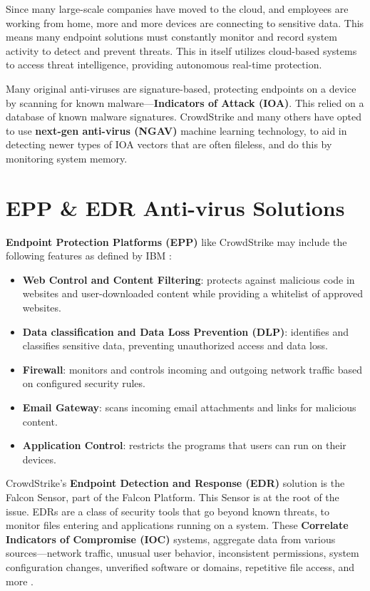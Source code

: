 Since many large-scale companies have moved to the cloud, and employees are working from home, more and more devices are connecting to sensitive data. This means many endpoint solutions must constantly monitor and record system activity to detect and prevent threats. This in itself utilizes cloud-based systems to access threat intelligence, providing autonomous real-time protection. \cite{cisco_endpoint_security}

Many original anti-viruses are signature-based, protecting endpoints on a device by scanning for known malware---\textbf{Indicators of Attack (IOA)}. 
This relied on a database of known malware signatures. CrowdStrike and many others have opted to use \textbf{next-gen anti-virus (NGAV)} machine learning technology, to aid in detecting newer types of IOA vectors that are often fileless, and do this by monitoring system memory.  \cite{ionescu_kernel_access_2024}

\newpage

\section{EPP \& EDR Anti-virus Solutions}
\textbf{Endpoint Protection Platforms (EPP)} like CrowdStrike may include the following features as defined by IBM \cite{ibm_endpoint_security}:

\begin{itemize}
    \item \textbf{Web Control and Content Filtering}: protects against malicious code in websites and user-downloaded content while providing a whitelist of approved websites.
    \item \textbf{Data classification and Data Loss Prevention (DLP)}: identifies and classifies sensitive data, 
    preventing unauthorized access and data loss.
    \item \textbf{Firewall}: monitors and controls incoming and outgoing network traffic based on configured security rules.
    \item \textbf{Email Gateway}: scans incoming email attachments and links for malicious content.
    \item \textbf{Application Control}: restricts the programs that users can run on their devices.
\end{itemize}

CrowdStrike's \textbf{Endpoint Detection and Response (EDR)} solution is the Falcon Sensor, part of the Falcon Platform. This Sensor is at the root of the issue.
EDRs are a class of security tools that go beyond known threats, to monitor files entering and applications running on a system.
These \textbf{Correlate Indicators of Compromise (IOC)} systems, aggregate data from various sources---network traffic, unusual user behavior, inconsistent permissions, system configuration changes, unverified software or domains, repetitive file access, and more \cite{microsoft_ioc}.

